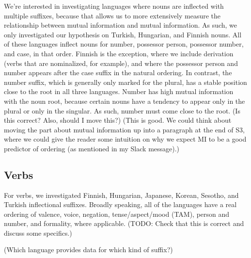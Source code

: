 \documentclass[11pt,letterpaper]{article}
\newcommand\mhahn[1]{{\color{red}(#1)}}
\newcommand\becky[1]{{\color{blue}(#1)}}
\begin{document}
We're interested in investigating languages where nouns are inflected with multiple suffixes, because that allows us to more extensively measure the relationship between mutual information and mutual information. As such, we only investigated our hypothesis on Turkish, Hungarian, and Finnish nouns. All of these languages inflect nouns for number, possessor person, possessor number, and case, in that order. Finnish is the exception, where we include derivation (verbs that are nominalized, for example), and where the possessor person and number appears after the case suffix in the natural ordering. 
In contrast, the number suffix, which is generally only marked for the plural, has a stable position close to the root in all three languages. Number has high mutual information with the noun root, because certain nouns have a tendency to appear only in the plural or only in the singular. As such, number must come close to the root. \becky{Is this correct? Also, should I move this?}
\mhahn{This is good. We could think about moving the part about mutual information up into a paragraph at the end of S3, where we could give the reader some intuition on why we expect MI to be a good predictor of ordering (as mentioned in my Slack message).}


\subsection{Verbs}
For verbs, we investigated Finnish, Hungarian, Japanese, Korean, Sesotho, and Turkish inflectional suffixes. Broadly speaking, all of the languages have a real ordering of valence, voice, negation, tense/aspect/mood (TAM), person and number, and formality, where applicable. \becky{TODO: Check that this is correct and discuss some specifics.} 

\becky{Which language provides data for which kind of suffix?}
\end{document}
